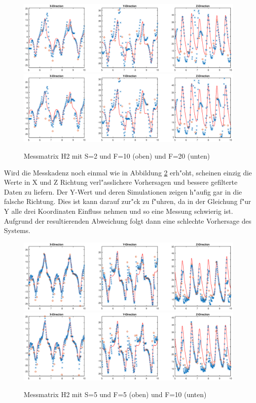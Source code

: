 \begin{refsection}
\begin{figure}
\centering
\includegraphics[width=\hsize]{kalman/figures/H2R10S2.eps}
\includegraphics[width=\hsize]{kalman/figures/H2R20S2.eps}
\caption{Messmatrix H2 mit S=2 und F=10 (oben) und F=20 (unten)}
\label{skript:H2S2}
\end{figure}

Wird die Messkadenz noch einmal wie in Abbildung \ref{skript:H2S5} erh"oht, scheinen einzig die Werte in X und Z Richtung verl"asslichere Vorhersagen und bessere gefilterte Daten zu liefern. Der Y-Wert und deren Simulationen zeigen h"aufig gar in die falsche Richtung. Dies ist kann darauf zur"ck zu f"uhren, da in der Gleichung f"ur Y alle drei Koordinaten Einfluss nehmen und so eine Messung  schwierig ist. Aufgrund der resultierenden Abweichung folgt dann eine schlechte Vorhersage des Systems.

\begin{figure}
\centering
\includegraphics[width=\hsize]{kalman/figures/H2R05S5.eps}
\includegraphics[width=\hsize]{kalman/figures/H2R10S5.eps}
\caption{Messmatrix H2 mit S=5 und F=5 (oben) und F=10 (unten)}
\label{skript:H2S5}
\end{figure}


\end{refsection}

